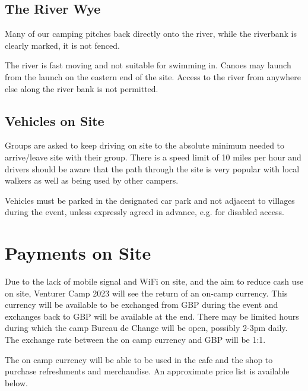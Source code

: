 \documentclass[a4paper, 11pt]{report}
\newcommand{\nl}{\newline}
\begin{document}
\section{The River Wye}
Many of our camping pitches back directly onto the river, while the riverbank is clearly marked, it is not fenced. \nl

The river is fast moving and not suitable for swimming in. Canoes may launch from the launch on the eastern end of the site. Access to the river from anywhere else along the river bank is not permitted. 

\section{Vehicles on Site}
Groups are asked to keep driving on site to the absolute minimum needed to arrive/leave site with their group.  There is a speed limit of 10 miles per hour and drivers should be aware that the path through the site is very popular with local walkers as well as being used by other campers.\nl

Vehicles must be parked in the designated car park and not adjacent to villages during the event, unless expressly agreed in advance, e.g. for disabled access.

\chapter{Payments on Site}
Due to the lack of mobile signal and WiFi on site, and the aim to reduce cash use on site, Venturer Camp 2023 will see the return of an on-camp currency.
This currency will be available to be exchanged from GBP during the event and exchanges back to GBP will be available at the end. There may be limited hours during which the camp Bureau de Change will be open, possibly 2-3pm daily. The exchange rate between the on camp currency and GBP will be 1:1.

The on camp currency will be able to be used in the cafe and the shop to purchase refreshments and merchandise. An approximate price list is available below.
\end{document}
